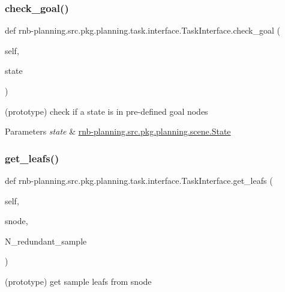 \subsubsection{\texorpdfstring{check\+\_\+goal()}{check\_goal()}}
{\footnotesize\ttfamily def rnb-\/planning.\+src.\+pkg.\+planning.\+task.\+interface.\+Task\+Interface.\+check\+\_\+goal (\begin{DoxyParamCaption}\item[{}]{self,  }\item[{}]{state }\end{DoxyParamCaption})}



(prototype) check if a state is in pre-\/defined goal nodes 


\begin{DoxyParams}{Parameters}
{\em state} & \hyperlink{classrnb-planning_1_1src_1_1pkg_1_1planning_1_1scene_1_1_state}{rnb-\/planning.\+src.\+pkg.\+planning.\+scene.\+State} \\
\hline
\end{DoxyParams}
\mbox{\label{classrnb-planning_1_1src_1_1pkg_1_1planning_1_1task_1_1interface_1_1_task_interface_a061e47756a27984939e4952a6906f6c5}} 
\subsubsection{\texorpdfstring{get\+\_\+leafs()}{get\_leafs()}}
{\footnotesize\ttfamily def rnb-\/planning.\+src.\+pkg.\+planning.\+task.\+interface.\+Task\+Interface.\+get\+\_\+leafs (\begin{DoxyParamCaption}\item[{}]{self,  }\item[{}]{snode,  }\item[{}]{N\+\_\+redundant\+\_\+sample }\end{DoxyParamCaption})}



(prototype) get sample leafs from snode 


